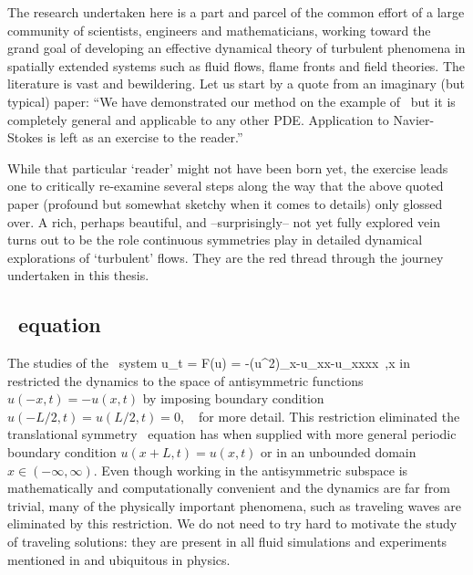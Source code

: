 The research undertaken here is a part and parcel of the
common effort of a large community of scientists, engineers and
mathematicians, working toward the grand goal of developing an effective  dynamical theory of turbulent phenomena in spatially extended systems
such as fluid flows, flame fronts and field theories.
The literature is vast and bewildering. Let us start by a
quote from an imaginary (but typical) paper: ``We have
demonstrated our method on the example of \KSe\ but it is completely
general and applicable to any other PDE. Application to
Navier-Stokes is left as an exercise to the reader.''

While that particular `reader' might not have been born yet,
the exercise leads one to critically re-examine several steps along the way that
the above quoted paper (profound but somewhat sketchy when it comes to details) only glossed over.
A rich, perhaps beautiful, and --surprisingly--  not yet fully explored
vein turns out to be the role continuous symmetries play in detailed dynamical explorations
of `turbulent' flows. They are the red thread through the journey undertaken in this thesis.

\subsection{\KS\ equation}

The studies of the \KS\ system
\beq
  u_t = F(u) = -{\textstyle{}}(u^2)_x-u_{xx}-u_{xxxx}
    \,,\qquad   x \in [-L/2,L/2]
in  restricted the dynamics
to the space of antisymmetric functions $u(-x,t)=-u(x,t)$ by imposing
boundary condition $u(-L/2,t)=u(L/2,t)=0$, \cf\  for more
detail. This restriction eliminated the translational symmetry \KS\ equation
has when supplied with more general periodic boundary condition $u(x+L,t)=u(x,t)$ or
in an unbounded domain $x\in(-\infty,\infty)$. Even though working in the antisymmetric
subspace is mathematically and computationally convenient and the dynamics are far
from trivial, many of the physically important phenomena,
such as traveling waves are eliminated by this restriction.
We do not need to try hard to motivate the
study of traveling solutions: they are present in all fluid simulations and experiments
mentioned in  and ubiquitous in physics.

